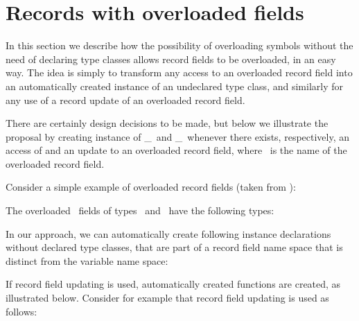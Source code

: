\section{Records with overloaded fields}
\label{sec:overloaded-record-fields}

In this section we describe how the possibility of overloading symbols
without the need of declaring type classes allows record fields to be
overloaded, in an easy way. The idea is simply to transform any access
to an overloaded record field into an automatically created instance
of an undeclared type class, and similarly for any use of a record
update of an overloaded record field. 

There are certainly design decisions to be made, but below we
illustrate the proposal by creating instance of \get\_\fieldname\ and
\update\_\fieldname\ whenever there exists, respectively, an access of
and an update to an overloaded record field, where \fieldname\ is the
name of the overloaded record field.

Consider a simple example of overloaded record fields (taken from
\cite{overloaded-record-fields-in-ghc}):

\progb{\data\ \Address\ \= = \Address\ \= \{ \id\ :: \Int, \address\ \= :: \String\ \= \kill
\data\ \Person\  \> = \Person\  \> \{ \id\ :: \Int, \name\    \> :: \String\ \>\}\\
\data\ \Address\ \> = \Address\ \> \{ \id\ :: \Int, \address\ \> :: \String\ \>\}
}

The overloaded \id\ fields of types \Person\ and \Address\ have the
following types:

\progb{\id\ :: \Address\ \= \kill
\id\ :: \Person\  \>$\rightarrow$ \Int\\
\id\ :: \Address\ \>$\rightarrow$ \Int
}

In our approach, we can automatically create following instance
declarations without declared type classes, that are part of a record
field name space that is distinct from the variable name space:


If record field updating is used, automatically created functions are
created, as illustrated below. Consider for example that record field
updating is used as follows:

